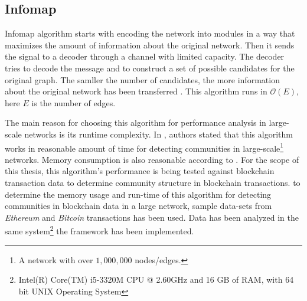 \subsection{Infomap}
Infomap algorithm starts with encoding the network into modules in a way that maximizes the amount of information about the original network. Then it sends the signal to a decoder through a channel with limited capacity. The decoder tries to decode the message and to construct a set of possible candidates for the original graph. The samller the number of candidates, the more information about the original network has been transferred \cite{ref-49}. This algorithm runs in $\mathcal{O}(E)$, here $E$ is the number of edges. 

The main reason for choosing this algorithm for performance analysis in large-scale networks is its runtime complexity. In \cite{ref-47}, authors stated that this algorithm works in reasonable amount of time for detecting communities in large-scale\footnote{A network with over $1,000,000$ nodes/edges.}\label{foot:large-scale} networks. Memory consumption is also reasonable according to \cite{ref-47}. For the scope of this thesis, this algorithm's performance is being tested against blockchain transaction data to determine community structure in blockchain transactions. to determine the memory usage and run-time of this algorithm for detecting communities in blockchain data in a large network, sample data-sets from \textit{Ethereum} and \textit{Bitcoin} transactions has been used. Data has been analyzed in the same system\footnote{Intel(R) Core(TM) i5-3320M CPU @ 2.60GHz and 16 GB of RAM, with 64 bit UNIX Operating System} the framework has been implemented. 

